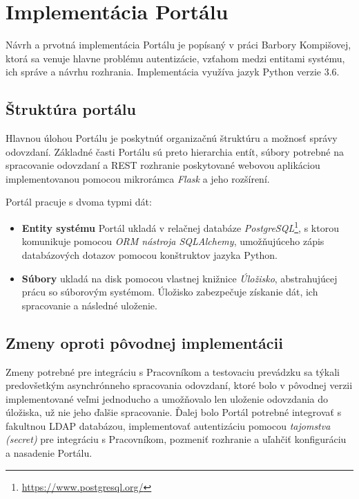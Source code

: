 \documentclass[
  digital, %
  twoside, %
  table,   %
  lof,     %
  lot,     %
]{fithesis3}
\begin{document}
\section{Implementácia Portálu}

Návrh a prvotná implementácia Portálu je popísaný v práci Barbory Kompišovej, ktorá sa venuje hlavne problému autentizácie, vzťahom medzi entitami systému, ich správe a návrhu rozhrania\cite{kontr-portal}. Implementácia využíva jazyk Python verzie 3.6. 

\subsection{Štruktúra portálu}

Hlavnou úlohou Portálu je poskytnúť organizačnú štruktúru a možnosť správy odovzdaní. Základné časti Portálu sú preto hierarchia entít, súbory potrebné na spracovanie odovzdaní a REST rozhranie poskytované webovou aplikáciou implementovanou pomocou mikrorámca \emph{Flask} a jeho rozšírení. 

Portál pracuje s dvoma typmi dát:
\begin{itemize}
  \item \textbf{Entity systému} Portál ukladá v relačnej databáze \emph{PostgreSQL}\footnote{\url{https://www.postgresql.org/}}, s ktorou komunikuje pomocou \emph{ORM nástroja SQLAlchemy}, umožňujúceho zápis databázových dotazov pomocou konštruktov jazyka Python.
  \item \textbf{Súbory} ukladá na disk pomocou vlastnej knižnice \emph{Úložisko}, abstrahujúcej prácu so súborovým systémom. Úložisko zabezpečuje získanie dát, ich spracovanie a následné uloženie.
\end{itemize}

\subsection{Zmeny oproti pôvodnej implementácii}

Zmeny potrebné pre integráciu s Pracovníkom a testovaciu prevádzku sa týkali predovšetkým asynchrónneho spracovania odovzdaní, ktoré bolo v pôvodnej verzii implementované veľmi jednoducho a umožňovalo len uloženie odovzdania do úložiska, už nie jeho ďalšie spracovanie. Ďalej bolo Portál potrebné integrovať s fakultnou LDAP databázou, implementovať autentizáciu pomocou \emph{tajomstva (secret)} pre integráciu s Pracovníkom, pozmeniť rozhranie a uľahčiť konfiguráciu a nasadenie Portálu.
\end{document}

